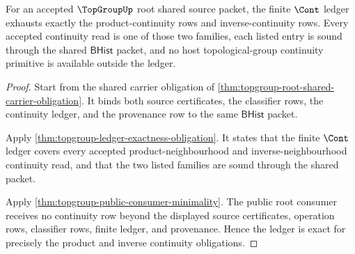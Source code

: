 \begin{theorem}
\label{thm:topgroup-root-ledger-exactness-obligation}
For an accepted $\TopGroupUp$ root shared source packet, the finite $\Cont$
ledger exhausts exactly the product-continuity rows and inverse-continuity
rows. Every accepted continuity read is one of those two families, each listed
entry is sound through the shared $\mathsf{BHist}$ packet, and no host
topological-group continuity primitive is available outside the ledger.
\end{theorem}
\begin{proof}
Start from the shared carrier obligation of
\autoref{thm:topgroup-root-shared-carrier-obligation}. It binds both source
certificates, the classifier rows, the continuity ledger, and the provenance
row to the same $\mathsf{BHist}$ packet.

Apply \autoref{thm:topgroup-ledger-exactness-obligation}. It states that the
finite $\Cont$ ledger covers every accepted product-neighbourhood and
inverse-neighbourhood continuity read, and that the two listed families are
sound through the shared packet.

Apply \autoref{thm:topgroup-public-consumer-minimality}. The public root
consumer receives no continuity row beyond the displayed source certificates,
operation rows, classifier rows, finite ledger, and provenance. Hence the
ledger is exact for precisely the product and inverse continuity obligations.
\end{proof}

